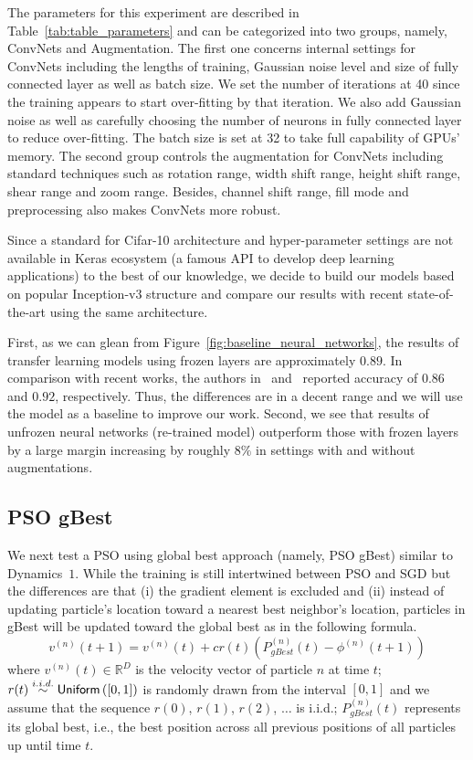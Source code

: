 \documentclass{ieeeaccess}
\begin{document}
The parameters for this experiment are described in Table~\ref{tab:table_parameters} and can be categorized into two groups, namely, ConvNets and Augmentation. The first one concerns internal settings for ConvNets including the lengths of training, Gaussian noise level and size of fully connected layer as well as batch size. We set the number of iterations at 40 since the training appears to start over-fitting by that iteration. We also add Gaussian noise as well as carefully choosing the number of neurons in fully connected layer to reduce over-fitting. The batch size is set at 32 to take full capability of GPUs' memory. The second group controls the augmentation for ConvNets including standard techniques such as rotation range, width shift range, height shift range, shear range and zoom range. Besides, channel shift range, fill mode and preprocessing also makes ConvNets more robust.

Since a standard for Cifar-10 architecture and hyper-parameter settings are not available in Keras ecosystem (a famous API to develop deep learning applications) to the best of our knowledge, we decide to build our models based on popular Inception-v3 structure and compare our results with recent state-of-the-art using the same architecture. 

First, as we can glean from Figure~\ref{fig:baseline_neural_networks}, the results of transfer learning models using frozen layers are approximately $0.89$. In comparison with recent works, the authors in~\cite{alkhouly2021improving} and~\cite{kalayeh2019training} reported accuracy of $0.86$ and $0.92$, respectively. Thus, the differences are in a decent range and we will use the model as a baseline to improve our work. Second, we see that results of unfrozen neural networks (re-trained model) outperform those with frozen layers by a large margin increasing by roughly $8\%$ in settings with and without augmentations.
\subsection{PSO gBest}
\label{sec:psobaseline}
We next test a PSO using global best approach (namely, PSO gBest) similar to Dynamics~$1$. While the training is still intertwined between PSO and SGD but the differences are that (i) the gradient element is excluded and (ii) instead of updating particle's location toward a nearest best neighbor's location, particles in gBest will be updated toward the global best as in the following formula.
\begin{equation}
v^{(n)}(t+1) = v^{(n)}(t)+c r(t)\left(P_{gBest}^{(n)}(t)-\phi^{(n)}(t+1)\right)
\label{eq:gbest}
\end{equation}
where $v^{(n)}(t)\in\mathbb{R}^{D}$ is the velocity vector of particle $n$ at time $t$; $r(t)\overset{i.i.d.}\sim {\sf Uniform}\left(\left[0,1\right]\right)$ is randomly drawn from the interval $\left[0,1\right]$ and we assume that the sequence $r(0)$, $r(1)$, $r(2)$, $\ldots$ is i.i.d.; $P_{gBest}^{(n)}(t)$ represents its global best, i.e., the best position across all previous positions of all particles up until time $t$.
\end{document}
